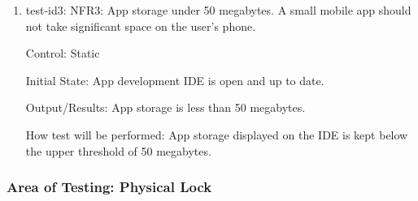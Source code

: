 \documentclass[12pt, titlepage]{article}
\begin{document}
\begin{enumerate}
\item{test-id3: NFR3: App storage under 50 megabytes. A small mobile app should not take significant space on the user’s phone.  \\}

Control: Static 

Initial State: App development IDE is open and up to date.

Output/Results: App storage is less than 50 megabytes.

How test will be performed: App storage displayed on the IDE is kept below the upper threshold of 50 megabytes. 

\end{enumerate}

\subsubsection{Area of Testing: Physical Lock}
\end{document}
